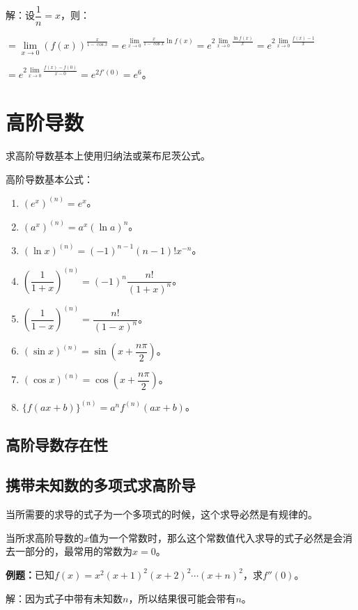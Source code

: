 \documentclass[UTF8, 12pt]{ctexart}
\begin{document}
解：设$\dfrac{1}{n}=x$，则：

$=\lim\limits_{x\to 0}(f(x))^{\frac{x}{1-\cos x}}=e^{\lim\limits_{x\to 0}\frac{x}{1-\cos x}\ln f(x)}=e^{2\lim\limits_{x\to 0}\frac{\ln f(x)}{x}}=e^{2\lim\limits_{x\to 0}\frac{f(x)-1}{x}}$

$=e^{2\lim\limits_{x\to 0}\frac{f(x)-f(0)}{x-0}}=e^{2f'(0)}=e^6$。

\section{高阶导数}

求高阶导数基本上使用归纳法或莱布尼茨公式。

高阶导数基本公式：

\begin{enumerate}
    \item $(e^x)^{(n)}=e^x$。
    \item $(a^x)^{(n)}=a^x(\ln a)^n$。
    \item $(\ln x)^{(n)}=(-1)^{n-1}(n-1)!x^{-n}$。
    \item $\left(\dfrac{1}{1+x}\right)^{(n)}=(-1)^n\dfrac{n!}{(1+x)^n}$。
    \item $\left(\dfrac{1}{1-x}\right)^{(n)}=\dfrac{n!}{(1-x)^n}$。
    \item $(\sin x)^{(n)}=\sin\left(x+\dfrac{n\pi}{2}\right)$。
    \item $(\cos x)^{(n)}=\cos\left(x+\dfrac{n\pi}{2}\right)$。
    \item $\{f(ax+b)\}^{(n)}=a^nf^{(n)}(ax+b)$。
\end{enumerate}

\subsection{高阶导数存在性}

\subsection{携带未知数的多项式求高阶导}

当所需要的求导的式子为一个多项式的时候，这个求导必然是有规律的。

当所求高阶导数的$x$值为一个常数时，那么这个常数值代入求导的式子必然是会消去一部分的，最常用的常数为$x=0$。

\textbf{例题：}已知$f(x)=x^2(x+1)^2(x+2)^2\cdots(x+n)^2$，求$f''(0)$。

解：因为式子中带有未知数$n$，所以结果很可能会带有$n$。
\end{document}
